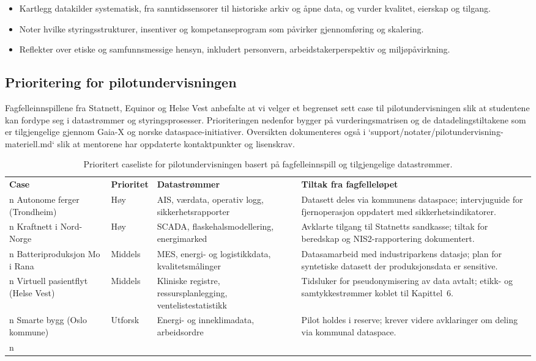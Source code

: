 \begin{itemize}
    \item Kartlegg datakilder systematisk, fra sanntidssensorer til historiske arkiv og åpne data, og vurder kvalitet, eierskap og tilgang.
    \item Noter hvilke styringsstrukturer, insentiver og kompetanseprogram som påvirker gjennomføring og skalering.
    \item Reflekter over etiske og samfunnsmessige hensyn, inkludert personvern, arbeidstakerperspektiv og miljøpåvirkning.
\end{itemize}

\subsection{Prioritering for pilotundervisningen}
Fagfelleinnspillene fra Statnett, Equinor og Helse Vest anbefalte at vi velger et begrenset sett case til pilotundervisningen slik at studentene kan fordype seg i datastrømmer og styringsprosesser. Prioriteringen nedenfor bygger på vurderingsmatrisen og de datadelingstiltakene som er tilgjengelige gjennom Gaia-X og norske dataspace-initiativer.\citep{gaiax2022architecture} Oversikten dokumenteres også i `support/notater/pilotundervisning-materiell.md` slik at mentorene har oppdaterte kontaktpunkter og lisenskrav.

\begin{table}[htbp]
    \centering
    \begin{tabular}{p{3.2cm}p{2.2cm}p{4.5cm}p{4.5cm}}
        \toprule
        \textbf{Case} & \textbf{Prioritet} & \textbf{Datastrømmer} & \textbf{Tiltak fra fagfelleløpet} \\n        \midrule
        Autonome ferger (Trondheim) & Høy & AIS, værdata, operativ logg, sikkerhetsrapporter & Datasett deles via kommunens dataspace; intervjuguide for fjernoperasjon oppdatert med sikkerhetsindikatorer. \\n        Kraftnett i Nord-Norge & Høy & SCADA, flaskehalsmodellering, energimarked & Avklarte tilgang til Statnetts sandkasse; tiltak for beredskap og NIS2-rapportering dokumentert. \\n        Batteriproduksjon Mo i Rana & Middels & MES, energi- og logistikkdata, kvalitetsmålinger & Datasamarbeid med industriparkens datasjø; plan for syntetiske datasett der produksjonsdata er sensitive. \\n        Virtuell pasientflyt (Helse Vest) & Middels & Kliniske registre, ressursplanlegging, ventelistestatistikk & Tidsluker for pseudonymisering av data avtalt; etikk- og samtykkestrømmer koblet til Kapittel~6. \\n        Smarte bygg (Oslo kommune) & Utforsk & Energi- og inneklimadata, arbeidsordre & Pilot holdes i reserve; krever videre avklaringer om deling via kommunal dataspace. \\n        \bottomrule
    \end{tabular}
    \caption{Prioritert caseliste for pilotundervisningen basert på fagfelleinnspill og tilgjengelige datastrømmer.}
\end{table}

